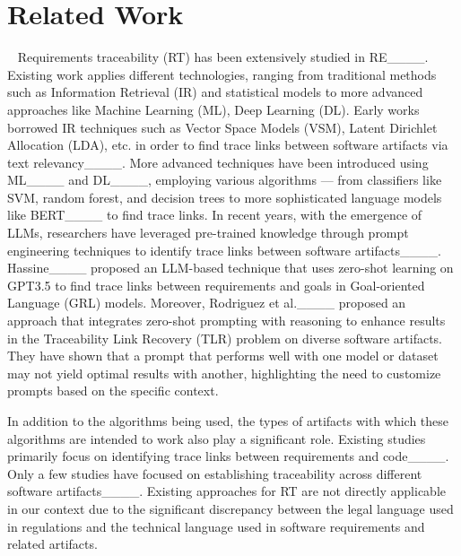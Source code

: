 \section{Related Work}
~\label{sec:related}
Requirements traceability (RT) has been extensively studied in RE____. 
Existing work applies different technologies, ranging from traditional methods such as Information Retrieval (IR) and statistical models to more advanced approaches like Machine Learning (ML), Deep Learning (DL). Early works borrowed IR techniques such as Vector Space Models (VSM), Latent Dirichlet Allocation (LDA), etc. in order to find trace links between software artifacts via text relevancy____.
More advanced techniques have been introduced using ML____ and DL____, employing various algorithms — from classifiers like SVM, random forest, and decision trees to more sophisticated language models like BERT____ to find trace links. 
In recent years, with the emergence of LLMs, researchers have leveraged pre-trained knowledge through prompt engineering techniques to identify trace links between software artifacts____. Hassine____ proposed an LLM-based technique that uses zero-shot learning on GPT3.5 to find trace links between requirements and goals in Goal-oriented Language (GRL) models. Moreover, Rodriguez et al.____ proposed an approach that integrates zero-shot prompting with reasoning to enhance results in the Traceability Link Recovery (TLR) problem on diverse software artifacts.
They have shown that a prompt that performs well with one model or dataset may not yield optimal results with another, highlighting the need to customize prompts based on the specific context.

In addition to the algorithms being used, the types of artifacts with which these algorithms are intended to work also play a significant role. Existing studies primarily focus on identifying trace links between requirements and code____. Only a few studies have focused on establishing traceability across different software artifacts____.
Existing approaches for RT are not directly applicable in our context due to the significant discrepancy between the legal language used in regulations and the technical language used in software requirements and related artifacts.  

